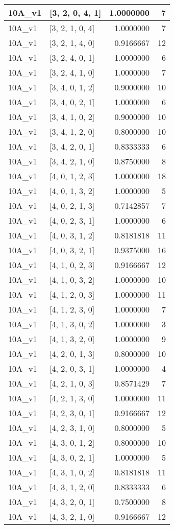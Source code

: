 \documentclass[]{book}
\theoremstyle{definition}
\theoremstyle{definition}
\theoremstyle{definition}
\theoremstyle{remark}
\begin{document}
\begin{tabular}{l|l|r|r}
\hline
10A\_v1 & [3, 2, 0, 4, 1] & 1.0000000 & 7\\
\hline
10A\_v1 & [3, 2, 1, 0, 4] & 1.0000000 & 7\\
\hline
10A\_v1 & [3, 2, 1, 4, 0] & 0.9166667 & 12\\
\hline
10A\_v1 & [3, 2, 4, 0, 1] & 1.0000000 & 6\\
\hline
10A\_v1 & [3, 2, 4, 1, 0] & 1.0000000 & 7\\
\hline
10A\_v1 & [3, 4, 0, 1, 2] & 0.9000000 & 10\\
\hline
10A\_v1 & [3, 4, 0, 2, 1] & 1.0000000 & 6\\
\hline
10A\_v1 & [3, 4, 1, 0, 2] & 0.9000000 & 10\\
\hline
10A\_v1 & [3, 4, 1, 2, 0] & 0.8000000 & 10\\
\hline
10A\_v1 & [3, 4, 2, 0, 1] & 0.8333333 & 6\\
\hline
10A\_v1 & [3, 4, 2, 1, 0] & 0.8750000 & 8\\
\hline
10A\_v1 & [4, 0, 1, 2, 3] & 1.0000000 & 18\\
\hline
10A\_v1 & [4, 0, 1, 3, 2] & 1.0000000 & 5\\
\hline
10A\_v1 & [4, 0, 2, 1, 3] & 0.7142857 & 7\\
\hline
10A\_v1 & [4, 0, 2, 3, 1] & 1.0000000 & 6\\
\hline
10A\_v1 & [4, 0, 3, 1, 2] & 0.8181818 & 11\\
\hline
10A\_v1 & [4, 0, 3, 2, 1] & 0.9375000 & 16\\
\hline
10A\_v1 & [4, 1, 0, 2, 3] & 0.9166667 & 12\\
\hline
10A\_v1 & [4, 1, 0, 3, 2] & 1.0000000 & 10\\
\hline
10A\_v1 & [4, 1, 2, 0, 3] & 1.0000000 & 11\\
\hline
10A\_v1 & [4, 1, 2, 3, 0] & 1.0000000 & 7\\
\hline
10A\_v1 & [4, 1, 3, 0, 2] & 1.0000000 & 3\\
\hline
10A\_v1 & [4, 1, 3, 2, 0] & 1.0000000 & 9\\
\hline
10A\_v1 & [4, 2, 0, 1, 3] & 0.8000000 & 10\\
\hline
10A\_v1 & [4, 2, 0, 3, 1] & 1.0000000 & 4\\
\hline
10A\_v1 & [4, 2, 1, 0, 3] & 0.8571429 & 7\\
\hline
10A\_v1 & [4, 2, 1, 3, 0] & 1.0000000 & 11\\
\hline
10A\_v1 & [4, 2, 3, 0, 1] & 0.9166667 & 12\\
\hline
10A\_v1 & [4, 2, 3, 1, 0] & 0.8000000 & 5\\
\hline
10A\_v1 & [4, 3, 0, 1, 2] & 0.8000000 & 10\\
\hline
10A\_v1 & [4, 3, 0, 2, 1] & 1.0000000 & 5\\
\hline
10A\_v1 & [4, 3, 1, 0, 2] & 0.8181818 & 11\\
\hline
10A\_v1 & [4, 3, 1, 2, 0] & 0.8333333 & 6\\
\hline
10A\_v1 & [4, 3, 2, 0, 1] & 0.7500000 & 8\\
\hline
10A\_v1 & [4, 3, 2, 1, 0] & 0.9166667 & 12\\
\hline
\end{tabular}
\end{document}
